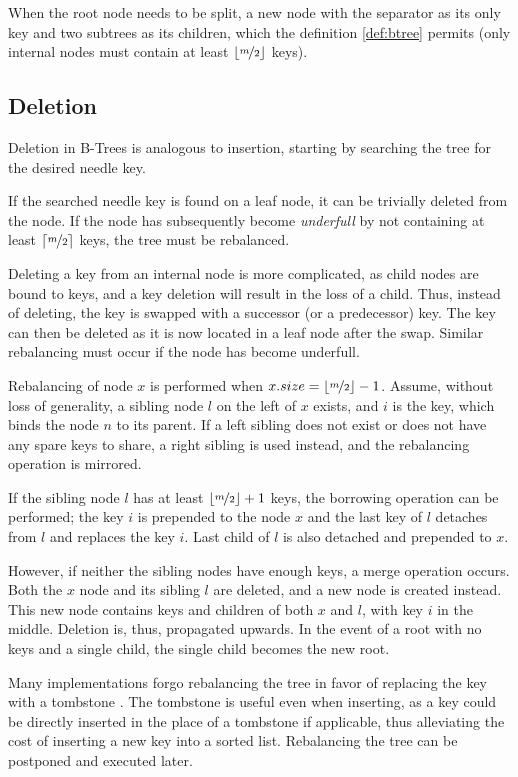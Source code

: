 When the root node needs to be split, a new node with the separator as its only key and two subtrees as its children, which the definition \cref{def:btree} permits (only internal nodes must contain at least $\lfloor\nicefrac{m}{2}\rfloor$ keys).

\subsection{Deletion}

Deletion in B-Trees is analogous to insertion, starting by searching the tree for the desired needle key.

If the searched needle key is found on a leaf node, it can be trivially deleted from the node. If the node has subsequently become \textit{underfull} by not containing at least $\lceil\nicefrac{m}{2}\rceil$ keys, the tree must be rebalanced.

Deleting a key from an internal node is more complicated, as child nodes are bound to keys, and a key deletion will result in the loss of a child. Thus, instead of deleting, the key is swapped with a successor (or a predecessor) key. The key can then be deleted as it is now located in a leaf node after the swap. Similar rebalancing must occur if the node has become underfull.

Rebalancing of node $x$ is performed when $x.size = \lfloor\nicefrac{m}{2}\rfloor - 1$. Assume, without loss of generality, a sibling node $l$ on the left of $x$ exists, and $i$ is the key, which binds the node $n$ to its parent. If a left sibling does not exist or does not have any spare keys to share, a right sibling is used instead, and the rebalancing operation is mirrored.

If the sibling node $l$ has at least $\lfloor\nicefrac{m}{2}\rfloor + 1$ keys, the borrowing operation can be performed; the key $i$ is prepended to the node $x$ and the last key of $l$ detaches from $l$ and replaces the key $i$. Last child of $l$ is also detached and prepended to $x$.

However, if neither the sibling nodes have enough keys, a merge operation occurs. Both the $x$ node and its sibling $l$ are deleted, and a new node is created instead. This new node contains keys and children of both $x$ and $l$, with key $i$ in the middle. Deletion is, thus, propagated upwards. In the event of a root with no keys and a single child, the single child becomes the new root.

Many implementations forgo rebalancing the tree in favor of replacing the key with a tombstone \cite{goetz-tech}. The tombstone is useful even when inserting, as a key could be directly inserted in the place of a tombstone if applicable, thus alleviating the cost of inserting a new key into a sorted list. Rebalancing the tree can be postponed and executed later.

